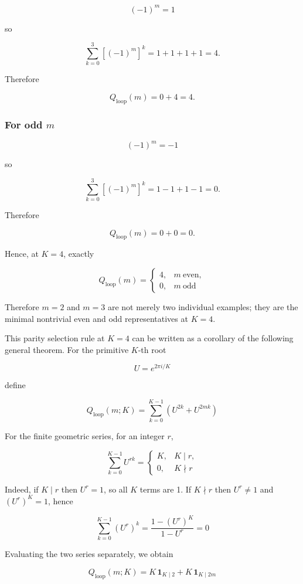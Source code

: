 \documentclass[
  a4paper,
]{article}
\begin{document}
\[
(-1)^m=1
\]

so

\[
\sum_{k=0}^{3}\left[(-1)^m\right]^k
=
1+1+1+1
=4.
\]

Therefore

\[
Q_{\mathrm{loop}}(m)
=0+4
=4.
\]

\subsubsection{\texorpdfstring{For odd
\(m\)}{For odd m}}\label{for-odd-m}

\[
(-1)^m=-1
\]

so

\[
\sum_{k=0}^{3}\left[(-1)^m\right]^k
=
1-1+1-1
=0.
\]

Therefore

\[
Q_{\mathrm{loop}}(m)
=0+0
=0.
\]

Hence, at \(K=4\), exactly

\[
\boxed{
Q_{\mathrm{loop}}(m)
=
\begin{cases}
4,&m\ \mathrm{even},\\
0,&m\ \mathrm{odd}
\end{cases}
}
\]

Therefore \(m=2\) and \(m=3\) are not merely two individual examples;
they are the minimal nontrivial even and odd representatives at \(K=4\).

This parity selection rule at \(K=4\) can be written as a corollary of
the following general theorem. For the primitive \(K\)-th root

\[
U=e^{2\pi i/K}
\]

define

\[
Q_{\mathrm{loop}}(m;K)
=
\sum_{k=0}^{K-1}
\left(U^{2k}+U^{2mk}\right)
\]

For the finite geometric series, for an integer \(r\),

\[
\sum_{k=0}^{K-1}U^{rk}
=
\begin{cases}
K,&K\mid r,\\
0,&K\nmid r
\end{cases}
\]

Indeed, if \(K\mid r\) then \(U^r=1\), so all \(K\) terms are 1. If
\(K\nmid r\) then \(U^r\ne1\) and \((U^r)^K=1\), hence

\[
\sum_{k=0}^{K-1}(U^r)^k
=
\frac{1-(U^r)^K}{1-U^r}
=
0
\]

Evaluating the two series separately, we obtain

\[
\boxed{
Q_{\mathrm{loop}}(m;K)
=
K\,\mathbf 1_{K\mid2}
+
K\,\mathbf 1_{K\mid2m}
}
\]
\end{document}
